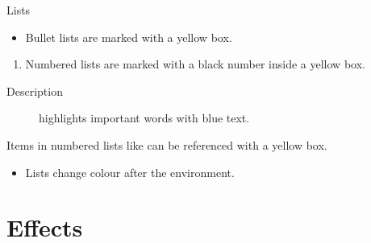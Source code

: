 \documentclass[UKenglish, aspectratio = 169]{beamer}
\begin{document}
\begin{frame}{Lists}

    \begin{itemize}
        \item
        Bullet lists are marked with a yellow box.
    \end{itemize}

    \begin{enumerate}
        \item
        \label{enum:item}
        Numbered lists are marked with a black number inside a yellow box.
    \end{enumerate}

    \begin{description}
        \item[Description] highlights important words with blue text.
    \end{description}

    Items in numbered lists like  can be referenced with a yellow box.

    \begin{example}
        \begin{itemize}
            \item
            Lists change colour after the environment.
        \end{itemize}
    \end{example}
\end{frame}

\section{Effects}
\end{document}
